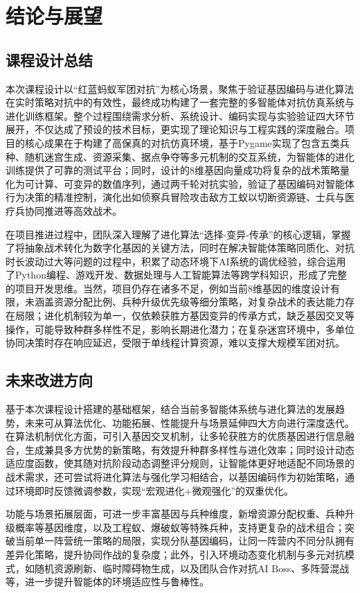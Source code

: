 \documentclass[12pt,a4paper]{article}
\begin{document}
	\section{结论与展望}
	\subsection{课程设计总结}
	本次课程设计以“红蓝蚂蚁军团对抗”为核心场景，聚焦于验证基因编码与进化算法在实时策略对抗中的有效性，最终成功构建了一套完整的多智能体对抗仿真系统与进化训练框架。整个过程围绕需求分析、系统设计、编码实现与实验验证四大环节展开，不仅达成了预设的技术目标，更实现了理论知识与工程实践的深度融合。项目的核心成果在于构建了高保真的对抗仿真环境，基于Pygame实现了包含五类兵种、随机迷宫生成、资源采集、据点争夺等多元机制的交互系统，为智能体的进化训练提供了可靠的测试平台；同时，设计的8维基因向量成功将复杂的战术策略量化为可计算、可变异的数值序列，通过两千轮对抗实验，验证了基因编码对智能体行为决策的精准控制，演化出如侦察兵冒险攻击敌方工蚁以切断资源链、士兵与医疗兵协同推进等高效战术。
	
	在项目推进过程中，团队深入理解了进化算法“选择-变异-传承”的核心逻辑，掌握了将抽象战术转化为数字化基因的关键方法，同时在解决智能体策略同质化、对抗时长波动过大等问题的过程中，积累了动态环境下AI系统的调优经验，综合运用了Python编程、游戏开发、数据处理与人工智能算法等跨学科知识，形成了完整的项目开发思维。当然，项目仍存在诸多不足，例如当前8维基因的维度设计有限，未涵盖资源分配比例、兵种升级优先级等细分策略，对复杂战术的表达能力存在局限；进化机制较为单一，仅依赖获胜方基因变异的传承方式，缺乏基因交叉等操作，可能导致种群多样性不足，影响长期进化潜力；在复杂迷宫环境中，多单位协同决策时存在响应延迟，受限于单线程计算资源，难以支撑大规模军团对抗。
	\subsection{未来改进方向}
	基于本次课程设计搭建的基础框架，结合当前多智能体系统与进化算法的发展趋势，未来可从算法优化、功能拓展、性能提升与场景延伸四大方向进行深度迭代。在算法机制优化方面，可引入基因交叉机制，让多轮获胜方的优质基因进行信息融合，生成兼具多方优势的新策略，有效提升种群多样性与进化效率；同时设计动态适应度函数，使其随对抗阶段动态调整评分规则，让智能体更好地适配不同场景的战术需求，还可尝试将进化算法与强化学习相结合，以基因编码作为初始策略，通过环境即时反馈微调参数，实现“宏观进化+微观强化”的双重优化。
	
	功能与场景拓展层面，可进一步丰富基因与兵种维度，新增资源分配权重、兵种升级概率等基因维度，以及工程蚁、爆破蚁等特殊兵种，支持更复杂的战术组合；突破当前单一阵营统一策略的局限，实现分队基因编码，让同一阵营内不同分队拥有差异化策略，提升协同作战的复杂度；此外，引入环境动态变化机制与多元对抗模式，如随机资源刷新、临时障碍物生成，以及团队合作对抗AI Boss、多阵营混战等，进一步提升智能体的环境适应性与鲁棒性。
	
\end{document}
